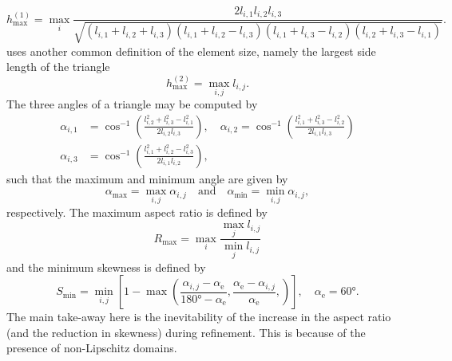 \begin{equation*}
	h_{\mathrm{max}}^{(1)} = \max_i\frac{2l_{i,1}l_{i,2}l_{i,3}}{\sqrt{(l_{i,1}+l_{i,2}+l_{i,3})(l_{i,1}+l_{i,2}-l_{i,3})(l_{i,1}+l_{i,3}-l_{i,2})(l_{i,2}+l_{i,3}-l_{i,1})}}.
\end{equation*}
\COMSOL uses another common definition of the element size, namely the largest side length of the triangle
\begin{equation*}
	h_{\mathrm{max}}^{(2)} = \max_{i,j} l_{i,j}.
\end{equation*}
The three angles of a triangle may be computed by
\begin{equation*}
\begin{aligned}
	\alpha_{i,1} &= \cos^{-1}\left(\frac{l_{i,2}^2+l_{i,3}^2-l_{i,1}^2}{2l_{i,2}l_{i,3}}\right),\quad
	\alpha_{i,2} = \cos^{-1}\left(\frac{l_{i,1}^2+l_{i,3}^2-l_{i,2}^2}{2l_{i,1}l_{i,3}}\right)\\
	\alpha_{i,3} &= \cos^{-1}\left(\frac{l_{i,1}^2+l_{i,2}^2-l_{i,3}^2}{2l_{i,1}l_{i,2}}\right),
\end{aligned}
\end{equation*}
such that the maximum and minimum angle are given by
\begin{equation*}
	\alpha_{\mathrm{max}} = \max_{i,j}\alpha_{i,j}\quad\text{and}\quad\alpha_{\mathrm{min}} = \min_{i,j}\alpha_{i,j},
\end{equation*}
respectively. The maximum aspect ratio is defined by
\begin{equation*}
	R_{\mathrm{max}} = \max_i \frac{\max_j l_{i,j}}{\min_j l_{i,j}}
\end{equation*}
and the minimum skewness is defined by
\begin{equation*}
	S_{\mathrm{min}} = \min_{i,j}\left[1-\max\left(\frac{\alpha_{i,j}-\alpha_{\mathrm{e}}}{\ang{180}-\alpha_{\mathrm{e}}}, \frac{\alpha_{\mathrm{e}}-\alpha_{i,j}}{\alpha_{\mathrm{e}}},\right)\right], \quad\alpha_{\mathrm{e}}= \ang{60}.
\end{equation*}
The main take-away here is the inevitability of the increase in the aspect ratio (and the reduction in skewness) during refinement. This is because of the presence of non-Lipschitz domains.